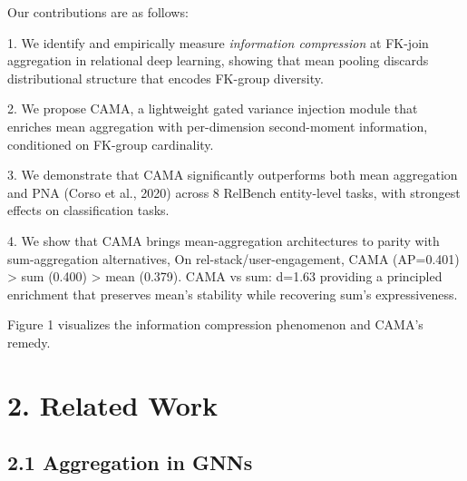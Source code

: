 \documentclass[final]{article}
\begin{document}
Our contributions are as follows:

1. We identify and empirically measure \textit{information compression} at FK-join aggregation in relational deep learning, showing that mean pooling discards distributional structure that encodes FK-group diversity.

2. We propose CAMA, a lightweight gated variance injection module that enriches mean aggregation with per-dimension second-moment information, conditioned on FK-group cardinality.

3. We demonstrate that CAMA significantly outperforms both mean aggregation and PNA (Corso et al., 2020) across 8 RelBench entity-level tasks, with strongest effects on classification tasks.

4. We show that CAMA brings mean-aggregation architectures to parity with sum-aggregation alternatives, On rel-stack/user-engagement, CAMA (AP=0.401) > sum (0.400) > mean (0.379). CAMA vs sum: d=1.63 providing a principled enrichment that preserves mean's stability while recovering sum's expressiveness.

Figure 1 visualizes the information compression phenomenon and CAMA's remedy.


\section{2. Related Work}

\subsection{2.1 Aggregation in GNNs}
\end{document}

